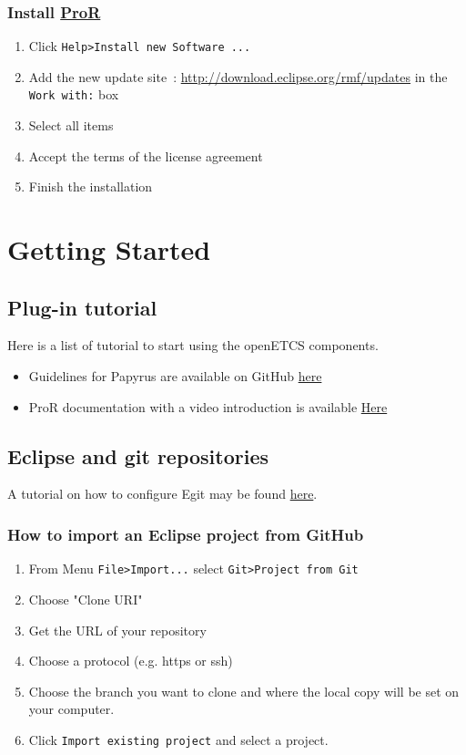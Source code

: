 \documentclass{openetcs_report}
\begin{document}
\subsection{Install \href{http://www.eclipse.org/rmf/pror/}{ProR}}
\begin{enumerate}
\item Click \verb+Help>Install new Software ...+
\item Add the new update site~:
\url{http://download.eclipse.org/rmf/updates} 
in the \verb+Work with:+ box
\item Select all items
\item Accept the terms of the license agreement
\item Finish the installation
\end{enumerate}

\chapter{Getting Started}

\section{Plug-in tutorial}
Here is a list of tutorial to start using the openETCS components.

\begin{itemize}
\item Guidelines for Papyrus are available on GitHub \href{https://github.com/openETCS/model-evaluation/tree/master/model/Papyrus-CEA-All4tec/papyrus_guidelines}{here}
\item  ProR documentation with a video introduction is available  \href{http://www.eclipse.org/rmf/pror/}{Here}
\end{itemize}

\section{Eclipse and  git repositories}
A tutorial on how to configure Egit may be found  \href{http://eclipsesource.com/blogs/tutorials/egit-tutorial/}{here}.
\subsection{How to import an Eclipse project from GitHub}
\begin{enumerate}
\item From Menu 
\verb+File>Import...+ select \verb+Git>Project from Git+
\item Choose "Clone URI"
\item Get the URL of your repository
\item Choose a protocol (e.g. https or ssh)
\item Choose the branch you want to clone and where the local copy
  will be set on your computer.
\item Click \verb+Import existing project+ and  select a project.

\end{enumerate}

\end{document}
